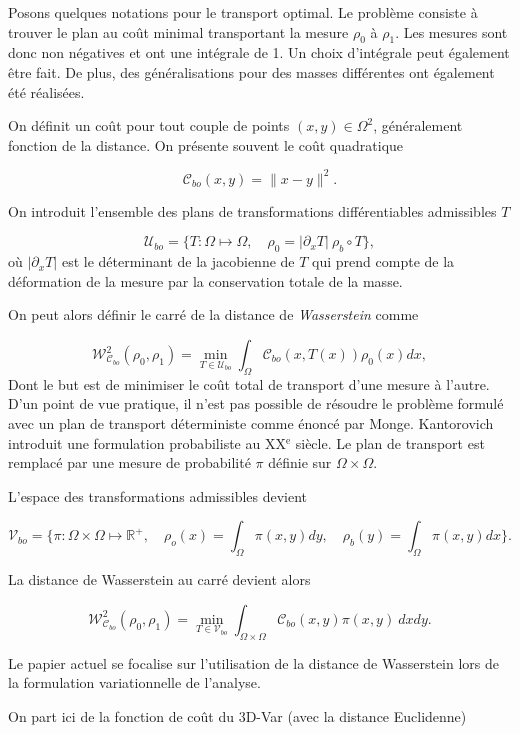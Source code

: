 \documentclass{article}
\newcommand{\norm}[1]{\|#1\|}
\begin{document}
Posons quelques notations pour le transport optimal. Le problème consiste à trouver le plan au coût minimal transportant la mesure $\rho_0$ à $\rho_1$. Les mesures sont donc non négatives et ont une intégrale de 1. Un choix d'intégrale peut également être fait. De plus, des généralisations pour des masses différentes ont également été réalisées.

On définit un coût pour tout couple de points $(x,y) \in \Omega^2$, généralement fonction de la distance. On présente souvent le coût quadratique

$$
    \mathcal C_{bo}(x,y) = \norm{x-y}^2.
$$

On introduit l'ensemble des plans de transformations différentiables admissibles $T$

$$
    \mathcal U_{bo} = \{T:\Omega \mapsto \Omega, \quad \rho_0 = |\partial_x T|~\rho_b \circ T\},
$$où $|\partial_x T|$ est le déterminant de la jacobienne de $T$ qui prend compte de la déformation de la mesure par la conservation totale de la masse.

On peut alors définir le carré de la distance de \textit{Wasserstein} comme

$$
    \mathcal{W}^2_{\mathcal{C}_{bo}}(\rho_0, \rho_1) = \min_{T \in \mathcal U_{bo}} \int_{\Omega} \mathcal C_{bo}(x,T(x)) \rho_0(x)dx,
$$
Dont le but est de minimiser le coût total de transport d'une mesure à l'autre. D'un point de vue pratique, il n'est pas possible de résoudre le problème formulé avec un plan de transport déterministe comme énoncé par Monge. Kantorovich introduit une formulation probabiliste au XX$^{\text{e}}$ siècle. Le plan de transport est remplacé par une mesure de probabilité $\pi$ définie sur $\Omega \times \Omega$.

L'espace des transformations admissibles devient

$$
    \mathcal V_{bo} = \{\pi : \Omega \times \Omega \mapsto \mathbb R^+, \quad \rho_o(x) = \int_\Omega \pi(x, y) dy, \quad \rho_b(y) = \int_\Omega \pi(x, y) dx\}.
$$

La distance de Wasserstein au carré devient alors

$$
    \mathcal{W}^2_{\mathcal{C}_{bo}}(\rho_0, \rho_1) = \min_{T \in \mathcal V_{bo}} \int_{\Omega \times \Omega} \mathcal C_{bo}(x,y) \pi(x, y)~dxdy.
$$

Le papier actuel se focalise sur l'utilisation de la distance de Wasserstein lors de la formulation variationnelle de l'analyse.


On part ici de la fonction de coût du 3D-Var (avec la distance Euclidenne)
\end{document}
